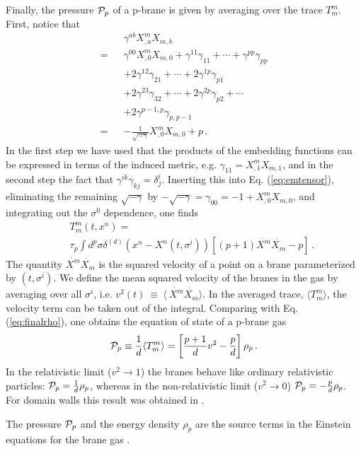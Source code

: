 \documentclass[a4paper,twocolumn,nofootinbib,tightenlines,prd,aps,
               superscriptaddress]{revtex4} %
\newcommand{\si}{\sigma}
\newcommand{\ga}{\gamma}
\newcommand{\de}{\delta}
\newcommand{\nn}{\nonumber}
\newcommand{\cP}{{\cal{P}}}
\begin{document}
Finally, the pressure $\cP_p$ of a p-brane is given by averaging
over the trace $T^m_m$. First, notice that
\begin{eqnarray}
     &&\ga^{ab} X^m_{,a}X_{m,b}\nn\\
    =&&\ga^{00}X^m_{,0} X_{m,0} + \ga^{11}\ga_{11}+ \cdots + \ga^{pp}\ga_{pp}\nn\\
          & & +2\ga^{12}\ga_{21} + \cdots + 2\ga^{1p}\ga_{p1}\nn\\
          & & +2\ga^{23}\ga_{32} + \cdots + 2\ga^{2p}\ga_{p2} + \cdots \nn\\
          & & +2\ga^{p-1,p}\ga_{p,p-1}\nn\\
    =&& -\frac{1}{\sqrt{-\ga}}X^m_{,0} X_{m,0} +
    p\,.
\end{eqnarray}
In the first step we have used that the products of the embedding
functions can be expressed in terms of the induced metric, e.g.
$\ga_{11} = X^m_{,1}X_{m,1}$, and in the second step the fact that
$\ga^{ik}\ga_{kj}=\de^i_j$. Inserting this into Eq.
(\ref{eq:emtensor}), eliminating the remaining $\sqrt{-\ga}$ by
$-\sqrt{-\ga} = \ga_{00} = -1 + X^m_{,0} X_{m,0}$, and integrating
out the $\si^0$ dependence, one finds
\begin{eqnarray}\label{eq:trace}
    &&T^m_m(t,x^n) = \\
    &&\tau_p \int d^p\si \de^{(d)}(x^n-X^n(t,\si^i))
                        [(p+1)\dot{X^m}\dot{X_m} - p]\,.\nn
\end{eqnarray}
The quantity $\dot{X^m}\dot{X_m}$ is the squared velocity of a
point on a brane parameterized by $(t,\si^i)$. We define the mean
squared velocity of the branes in the gas by averaging over all
$\si^i$, i.e. $v^2(t)~\equiv~ \langle~\dot{X^m}\dot{X_m}\rangle$.
In the averaged trace, $\langle T^m_m \rangle$, the velocity term
can be taken out of the integral. Comparing with Eq.
(\ref{eq:finalrho}), one obtains the equation of state of a
p-brane gas
\begin{equation}
    \cP_p \equiv \frac{1}{d}\langle T^m_m \rangle = \left[\frac{p+1}{d}v^2
    -\frac{p}{d}\right]\rho_p\,.
\end{equation}
In the relativistic limit ($v^2 \rightarrow 1$) the branes behave
like ordinary relativistic particles: $\cP_p = \frac{1}{d}\rho_p$,
whereas in the non-relativistic limit ($v^2 \rightarrow 0$) $\cP_p
= -\frac{p}{d}\rho_p$. For domain walls this result was obtained
in \cite{Zeldovich:1974uw}.

The pressure $\cP_p$ and the energy density $\rho_p$ are the
source terms in the Einstein equations for the brane gas
\cite{Alexander:2000xv,Tseytlin:1992xk}.
\end{document}
